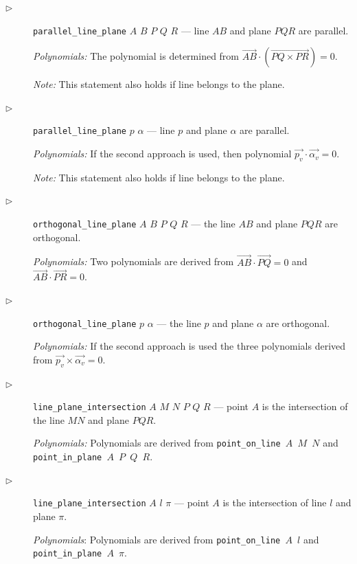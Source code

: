 \documentclass[final,1p,times,authoryear]{elsarticle}
\begin{document}
\begin{description}
\item[$\triangleright$] {\tt parallel\_line\_plane} $A$ $B$ $P$ $Q$ $R$ ---
  line $AB$ and plane $PQR$ are parallel.

  {\em Polynomials:} The polynomial is determined from
  $\overrightarrow{AB} \cdot (\overrightarrow{PQ \times PR}) = 0$.

{\em Note:} This statement also holds if line belongs to the plane.

\item[$\triangleright$] {\tt parallel\_line\_plane} $p$ $\alpha$ ---
  line $p$ and plane $\alpha$ are parallel.

  {\em Polynomials:} If the second approach is used, then polynomial
  $\overrightarrow{p_v} \cdot \overrightarrow{\alpha_v} = 0$.

{\em Note:} This statement also holds if line belongs to the plane.

\item[$\triangleright$] {\tt orthogonal\_line\_plane} $A$ $B$ $P$ $Q$
  $R$ --- the line $AB$ and plane $PQR$ are orthogonal.

  {\em Polynomials:} Two polynomials are derived from
  $\overrightarrow{AB} \cdot \overrightarrow{PQ} = 0$ and
  $\overrightarrow{AB} \cdot \overrightarrow{PR} = 0$.

\item[$\triangleright$] {\tt orthogonal\_line\_plane} $p$ $\alpha$ ---
  the line $p$ and plane $\alpha$ are orthogonal.

  {\em Polynomials:} If the second approach is used the three
  polynomials derived from
  $\overrightarrow{p_v} \times \overrightarrow{\alpha_v} = 0$.

\item[$\triangleright$] {\tt line\_plane\_intersection} $A$ $M$ $N$
  $P$ $Q$ $R$ --- point $A$ is the intersection of the line $MN$ and
  plane $PQR$.

  {\em Polynomials:} Polynomials are derived from {\tt point\_on\_line
    $A$ $M$ $N$} and {\tt point\_in\_plane $A$ $P$ $Q$ $R$}.

\item[$\triangleright$] {\tt line\_plane\_intersection} $A$ $l$ $\pi$ ---
  point $A$ is the intersection of line $l$ and plane $\pi$.

  {\em Polynomials}: Polynomials are derived from {\tt point\_on\_line
    $A$ $l$} and {\tt point\_in\_plane $A$ $\pi$}.


\end{description}
\end{document}
